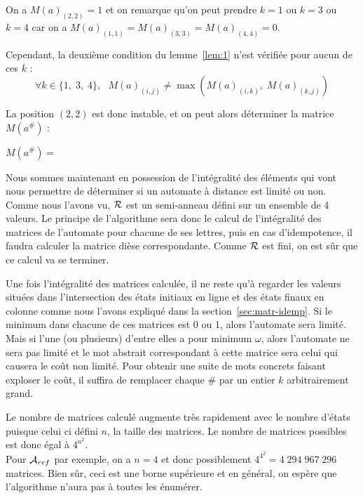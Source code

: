 \documentclass[12pt]{memoir}
\begin{document}
On a $M(a)_{(2,2)} = 1$ et on remarque qu'on peut prendre $k=1$ ou $k= 3$ ou $k=4$ car on a $M(a)_{(1,1)} = M(a)_{(3,3)} = M(a)_{(4,4)} = 0$.

\smallskip
Cependant, la deuxième condition du lemme~\ref{lem:1} n'est vérifiée pour aucun de ces $k$ : 
\[\forall k \in \{1,\; 3,\; 4\},\ \ \ M(a)_{(i,j)} \neq \max(M(a)_{(i,k)}, \; M(a)_{(k,j)})\]

La position $(2,2)$ est donc instable, et on peut alors déterminer la matrice $M(a^{\#})$ :
\begin{center}
$M(a^{\#})=$
\end{center}
$ $\\
Nous sommes maintenant en possession de l'intégralité des éléments qui vont
nous permettre de déterminer si un automate à distance est limité ou
non. Comme nous l'avons vu, $\mathcal{R}$ est un semi-anneau défini sur un ensemble de
4 valeurs. Le principe de l'algorithme sera donc le calcul de l'intégralité
des matrices de l'automate pour chacune de ses lettres, puis en cas
d'idempotence, il faudra calculer la matrice dièse correspondante. Comme $\mathcal{R}$
est fini, on est sûr que ce calcul va se terminer.

\medskip
Une fois l'intégralité des matrices calculée, il ne reste qu'à regarder les
valeurs situées dans l'intersection des états initiaux en ligne et des états
finaux en colonne comme nous l'avons expliqué dans la
section~\ref{sec:matr-idemp}. Si le minimum dans chacune de ces matrices est 0
ou 1, alors l'automate sera limité. Mais si l'une (ou plusieurs) d'entre elles
a pour minimum $\omega$, alors l'automate ne sera pas limité et le mot
abstrait correspondant à cette matrice sera celui qui causera le coût non
limité. Pour obtenir une suite de mots concrets faisant exploser le coût, il
suffira de remplacer chaque $\#$ par un entier $k$ arbitrairement grand.

\medskip
Le nombre de matrices calculé augmente très rapidement avec le nombre d'états puisque celui ci défini $n$, la taille des matrices. Le nombre de matrices possibles est donc égal à $4^{n^{2}}$.\\
Pour $\mathcal{A}_{ref}$ par exemple, on a $n=4$ et donc possiblement $4^{4^{2}} =
4\;294\;967\;296$ matrices. Bien sûr, ceci est une borne supérieure et en
général, on espère que l'algorithme n'aura pas à toutes les énumérer.
\end{document}
